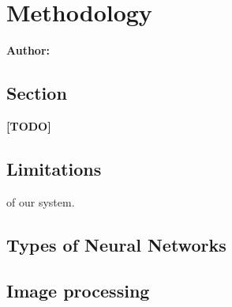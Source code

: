 \chapter{Methodology}

\textbf{Author: } 

\section{Section}
\textbf{[TODO]}
\newline
\lipsum[1]

\section{Limitations}
of our system.

\section{Types of Neural Networks}

\section{Image processing}

\filbreak